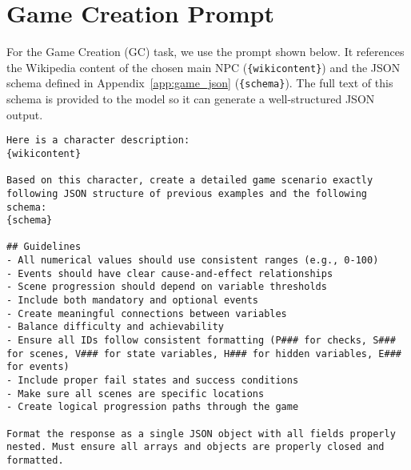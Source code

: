\section{Game Creation Prompt}\label{app:gc_prompt}
For the Game Creation (GC) task, we use the prompt shown below. It references the Wikipedia content of the chosen main NPC (\texttt{\{wikicontent\}}) and the JSON schema defined in Appendix~\ref{app:game_json} (\texttt{\{schema\}}). The full text of this schema is provided to the model so it can generate a well-structured JSON output.
\begin{center}
\begin{minipage}{0.95\textwidth}
\begin{lstlisting}[language=plaintext, frame=none, numbers=none]
Here is a character description:
{wikicontent}

Based on this character, create a detailed game scenario exactly following JSON structure of previous examples and the following schema:
{schema}

## Guidelines
- All numerical values should use consistent ranges (e.g., 0-100)
- Events should have clear cause-and-effect relationships
- Scene progression should depend on variable thresholds
- Include both mandatory and optional events
- Create meaningful connections between variables
- Balance difficulty and achievability
- Ensure all IDs follow consistent formatting (P### for checks, S### for scenes, V### for state variables, H### for hidden variables, E### for events)
- Include proper fail states and success conditions
- Make sure all scenes are specific locations
- Create logical progression paths through the game

Format the response as a single JSON object with all fields properly nested. Must ensure all arrays and objects are properly closed and formatted.
\end{lstlisting}
\end{minipage}
\end{center}

